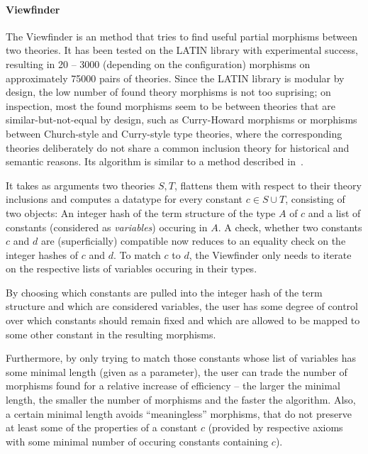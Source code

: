 \paragraph{Viewfinder}\label{sec:viewfinder}
The Viewfinder is an \mmt method that tries to find useful partial morphisms between two theories. It has been tested on the \textsf{LATIN} library with experimental success, resulting in 20 -- 3000 (depending on the configuration) morphisms on approximately 75000 pairs of theories. Since the \textsf{LATIN} library is modular by design, the low number of found theory morphisms is not too suprising; on inspection, most the found morphisms seem to be between theories that are similar-but-not-equal by design, such as Curry-Howard morphisms or morphisms between Church-style and Curry-style type theories, where the corresponding theories deliberately do not share a common inclusion theory for historical and semantic reasons. Its algorithm is similar to a method described in~\cite{Normann:phd}.

It takes as arguments two \mmt theories $S,T$, flattens them with respect to their theory inclusions and computes a datatype for every constant $c\in S\cup T$, consisting of two objects: An integer hash of the term structure of the type $A$ of $c$ and a list of constants (considered as \emph{variables}) occuring in $A$. A check, whether two constants $c$ and $d$ are (superficially) compatible now reduces to an equality check on the integer hashes of $c$ and $d$. To match $c$ to $d$, the Viewfinder only needs to iterate on the respective lists of variables occuring in their types.

By choosing which constants are pulled into the integer hash of the term structure and which are considered variables, the user has some degree of control over which constants should remain fixed and which are allowed to be mapped to some other constant in the resulting morphisms.

Furthermore, by only trying to match those constants whose list of variables has some minimal length (given as a parameter), 
the user can trade the number of morphisms found for a relative increase of efficiency -- the larger the minimal length, the smaller the number of morphisms and the faster the algorithm. Also, a certain minimal length avoids ``meaningless'' morphisms, that do not preserve at least some of the properties of a constant $c$ (provided by respective axioms with some minimal number of occuring constants containing $c$).

